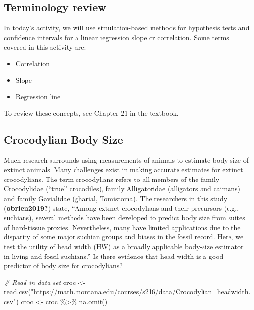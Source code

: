 \documentclass[
]{report}
\newenvironment{Shaded}{\begin{snugshade}}{\end{snugshade}}
\newcommand{\CommentTok}[1]{\textcolor[rgb]{0.56,0.35,0.01}{\textit{#1}}}
\newcommand{\FunctionTok}[1]{\textcolor[rgb]{0.00,0.00,0.00}{#1}}
\newcommand{\NormalTok}[1]{#1}
\newcommand{\OtherTok}[1]{\textcolor[rgb]{0.56,0.35,0.01}{#1}}
\newcommand{\SpecialCharTok}[1]{\textcolor[rgb]{0.00,0.00,0.00}{#1}}
\newcommand{\StringTok}[1]{\textcolor[rgb]{0.31,0.60,0.02}{#1}}
\begin{document}
\hypertarget{terminology-review-6}{%
\subsection{Terminology review}\label{terminology-review-6}}

In today's activity, we will use simulation-based methods for hypothesis tests and confidence intervals for a linear regression slope or correlation. Some terms covered in this activity are:

\begin{itemize}
\item
  Correlation
\item
  Slope
\item
  Regression line
\end{itemize}

To review these concepts, see Chapter 21 in the textbook.

\hypertarget{crocodylian-body-size}{%
\subsection{Crocodylian Body Size}\label{crocodylian-body-size}}

Much research surrounds using measurements of animals to estimate body-size of extinct animals. Many challenges exist in making accurate estimates for extinct crocodylians. The term crocodylians refers to all members of the family Crocodylidae (``true'' crocodiles), family Alligatoridae (alligators and caimans) and family Gavialidae (gharial, Tomistoma). The researchers in this study (\textbf{obrien2019?}) state, ``Among extinct crocodylians and their precursors (e.g., suchians), several methods have been developed to predict body size from suites of hard-tissue proxies. Nevertheless, many have limited applications due to the disparity of some major suchian groups and biases in the fossil record. Here, we test the utility of head width (HW) as a broadly applicable body-size estimator in living and fossil suchians.'' Is there evidence that head width is a good predictor of body size for crocodylians?

\begin{Shaded}
\begin{Highlighting}[]
\CommentTok{\# Read in data set}
\NormalTok{croc }\OtherTok{\textless{}{-}} \FunctionTok{read.csv}\NormalTok{(}\StringTok{"https://math.montana.edu/courses/s216/data/Crocodylian\_headwidth.csv"}\NormalTok{)}
\NormalTok{croc }\OtherTok{\textless{}{-}}\NormalTok{ croc }\SpecialCharTok{\%\textgreater{}\%}
    \FunctionTok{na.omit}\NormalTok{()}
\end{Highlighting}
\end{Shaded}
\end{document}
